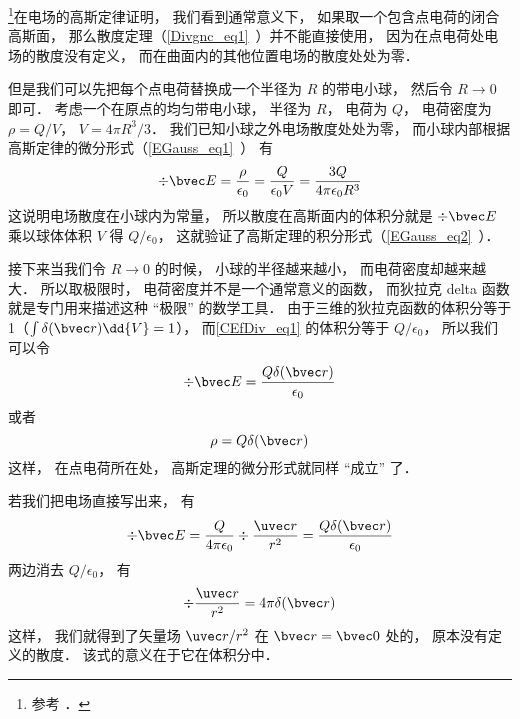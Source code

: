 
\begin{issues}
\issueDraft
\end{issues}


\footnote{参考 \cite{GriffE}．}在电场的高斯定律证明， 我们看到通常意义下， 如果取一个包含点电荷的闭合高斯面， 那么散度定理（\autoref{Divgnc_eq1}~）并不能直接使用， 因为在点电荷处电场的散度没有定义， 而在曲面内的其他位置电场的散度处处为零．

但是我们可以先把每个点电荷替换成一个半径为 $R$ 的带电小球， 然后令 $R\to 0$ 即可． 考虑一个在原点的均匀带电小球， 半径为 $R$， 电荷为 $Q$， 电荷密度为 $\rho = Q/V$， $V = 4\pi R^3/3$． 我们已知小球之外电场散度处处为零， 而小球内部根据高斯定律的微分形式（\autoref{EGauss_eq1}~） 有
\begin{equation}\label{CEfDiv_eq1}
\div \bvec E = \frac{\rho}{\epsilon_0} = \frac{Q}{\epsilon_0 V} = \frac{3Q}{4\pi \epsilon_0 R^3}
\end{equation}
这说明电场散度在小球内为常量， 所以散度在高斯面内的体积分就是 $\div \bvec E$ 乘以球体体积 $V$ 得 $Q/\epsilon_0$， 这就验证了高斯定理的积分形式（\autoref{EGauss_eq2}~）．

接下来当我们令 $R\to 0$ 的时候， 小球的半径越来越小， 而电荷密度却越来越大． 所以取极限时， 电荷密度并不是一个通常意义的函数， 而狄拉克 delta 函数就是专门用来描述这种 “极限” 的数学工具． 由于三维的狄拉克函数的体积分等于 1（$\int \delta(\bvec r)\dd{V} = 1$）， 而\autoref{CEfDiv_eq1} 的体积分等于 $Q/\epsilon_0$， 所以我们可以令
\begin{equation}
\div \bvec E = \frac{Q\delta(\bvec r)}{\epsilon_0}
\end{equation}
或者
\begin{equation}
\rho = Q\delta(\bvec r)
\end{equation}
这样， 在点电荷所在处， 高斯定理的微分形式就同样 “成立” 了．

若我们把电场直接写出来， 有
\begin{equation}
\div \bvec E = \frac{Q}{4\pi\epsilon_0}\div \frac{\uvec r}{r^2} = \frac{Q\delta(\bvec r)}{\epsilon_0}
\end{equation}
两边消去 $Q/\epsilon_0$， 有
\begin{equation}
\div \frac{\uvec r}{r^2} = 4\pi\delta(\bvec r)
\end{equation}
这样， 我们就得到了矢量场 ${\uvec r}/{r^2}$ 在 $\bvec r = \bvec 0$ 处的， 原本没有定义的散度． 该式的意义在于它在体积分中．



